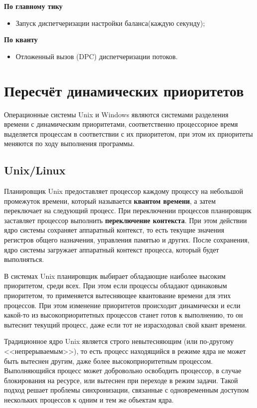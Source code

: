 \textbf{По главному тику}
\begin{itemize}
	\item Запуск диспетчеризации настройки баланса(каждую секунду);
\end{itemize}

\textbf{По кванту}
\begin{itemize}
	\item Отложенный вызов (DPC) диспетчеризации потоков.
\end{itemize}


\chapter{Пересчёт динамических приоритетов}

Операционные системы Unix и Windows являются системами разделения времени с динамическим приоритетами, соответственно процессорное время выделяется процессам в соответствии с их приоритетом, при этом их приоритеты меняются по ходу выполнения программы.

\section{Unix/Linux}

Планировщик Unix предоставляет процессор каждому процессу на небольшой промежуток времени, который называется \textbf{квантом времени}, а затем переключает на следующий процесс. При переключении процессов планировщик заставляет процессор выполнить \textbf{переключение контекста}. При этом действии ядро системы сохраняет аппаратный контекст, то есть текущие значения регистров общего назначения, управления памятью и других. После сохранения, ядро системы загружает аппаратный контекст процесса, который будет выполняться.

В системах Unix планировщик выбирает обладающие наиболее высоким приоритетом, среди всех. При этом если процессы обладают одинаковым приоритетом, то применяется вытесняющее квантование времени для этих процессов. При этом изменение приоритетов происходит динамически и если какой-то из высокоприоритетных процессов станет готов к выполнению, то он вытеснит текущий процесс, даже если тот не израсходовал свой квант времени.


Традиционное ядро Unix является строго невытесняющим (или по-другому <<непрерываемым>>), то есть процесс находящийся в режиме ядра не может быть вытеснен другим, даже более высокоприоритетным процессом. Выполняющийся процесс может добровольно освободить процессор, в случае блокирования на ресурсе, или вытеснен при переходе в режим задачи. Такой подход решает проблемы синхронизации, связанные с одновременным доступом нескольких процессов к одним и тем же объектам ядра.

